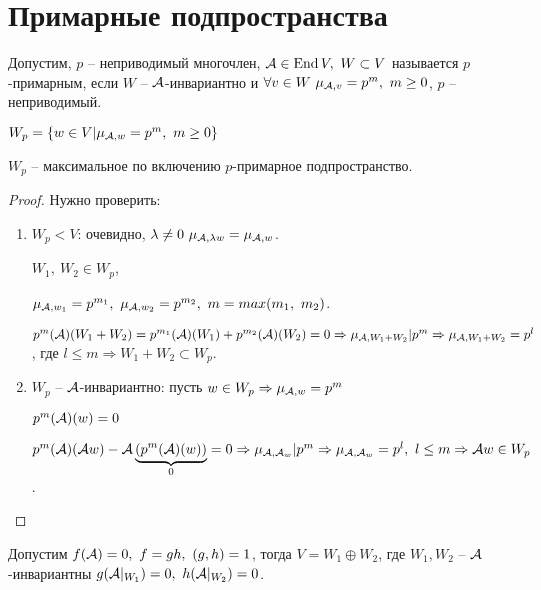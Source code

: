 \documentclass[main]{subfiles}
\begin{document}
\chapter{Примарные подпространства}

\begin{definition} 
    Допустим, $p$ -- неприводимый многочлен, $\mca \in \End V, \ W \subset V$ называется $p$-примарным, если $W$ -- $\mathcal{A}$-инвариантно
    и $\forall v \in W \ \mu_{\mathcal{A}, v} = p^m, \ m \geq 0$, $p$ -- неприводимый.

    $W_p = \{w \in V | \mu_{\mathcal{A}, w} = p^m, \ m \geq 0\}$
\end{definition}

\begin{proposition}
    $W_p$ -- максимальное по включению $p$-примарное подпространство.
\end{proposition}

\begin{proof}
    Нужно проверить:
    \begin{enumerate}
        \item $W_p < V$: очевидно, $\lambda \neq 0 \ \mu_{\mathcal{A}, \lambda w} = \mu_{\mathcal{A}, w}$.

              $W_1, \ W_2 \in W_p$,

              $\mu_{\mathcal{A}, w_1} = p^{m_1}, \ \mu_{\mathcal{A}, w_2} = p^{m_2}, \ m = max(m_1, \ m_2)$.

              $p^m(\mathcal{A})(W_1+W_2) = p^{m_1}(\mathcal{A})(W_1)+ p^{m_2}(\mathcal{A})(W_2) = 0 \Rightarrow
                  \mu_{\mathcal{A}, W_1 +W_2} | p^m \Rightarrow \mu_{\mathcal{A}, W_1 +W_2} = p^l$, где $l \leq m \Rightarrow W_1+W_2 \subset W_p$.
        \item $W_p$ -- $\mathcal{A}$-инвариантно: пусть $w \in W_p \Rightarrow \mu_{\mathcal{A}, w} = p^m$

              $p^m(\mathcal{A})(w) = 0$

              $p^m(\mathcal{A})(\mathcal{A} w) - \mathcal{A}\underbrace{(p^m(\mathcal{A})(w))}_{0} = 0 \Rightarrow \mu_{\mathcal{A}, \mathcal{A}_w} | p^m \Rightarrow \mu_{\mathcal{A}, \mathcal{A}_w} = p^l, \ l \leq m \Rightarrow \mathcal{A} w \in W_p$.
    \end{enumerate}
\end{proof}

\begin{proposition}
    Допустим $f(\mathcal{A}) = 0, \ f = gh, \ (g, h) = 1$, тогда $V = W_1 \oplus W_2$, где
    $W_1, W_2$ -- $\mathcal{A}$-инвариантны  $g(\mathcal{A}|_{W_1}) = 0, \  h(\mathcal{A} |_{W_2}) = 0$.
\end{proposition}
\end{document}
